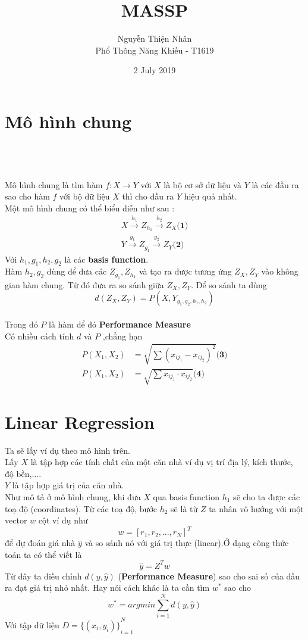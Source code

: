 \documentclass[12pt]{article}
\title{
    MASSP}
\author{
    Nguyễn Thiện Nhân \\
    \large Phổ Thông Năng Khiếu - T1619}
\date{2 July 2019}
\newcommand{\<}{\langle}
\renewcommand{\>}{\rangle}
\theoremstyle{definition}
\begin{document}
\maketitle
\section{Mô hình chung}
\\
\\
\\
Mô hình chung là tìm hàm $f: X \rightarrow Y$ với $X$ là bộ cơ sở dữ liệu và $Y$ là các đầu ra sao cho hàm $f$ với bộ dữ liệu $X$ thì cho đầu ra $Y$ hiệu quả nhất.\\
Một mô hình chung có thể biểu diễn như sau :
\begin{align*}
X \overset{h_1}{\rightarrow}  Z_{h_{1}} \overset{h_2}{\rightarrow} Z_X \textbf{(1)} \\  
Y \overset{g_1}{\rightarrow}  Z_{g_{1}} \overset{g_2}{\rightarrow} Z_Y \textbf{(2)}
\end{align*}
Với $h_1,g_1,h_2,g_2$ là các \textbf{basis function}.\\
Hàm $h_2,g_2$ dùng để đưa các $Z_{g_{1}},Z_{h_{1}}$ và tạo ra được tương ứng $Z_X,Z_Y$ vào không gian hàm chung. Từ đó đưa ra so sánh giữa $Z_X,Z_Y$.
Để so sánh ta dùng $$d(Z_X,Z_Y)=P(X,Y _{g_{1},g_{2},h_{1},h_{2}})$$\\
Trong đó $P$ là hàm để đó \textbf{Performance Measure}\\
Có nhiều cách tính $d$ và $P$ ,chẳng hạn
\begin{align*}
    P(X_1,X_2)&=\sqrt {\sum (x_{ij_1}-x_{ij_2})^2 } \textbf{(3)}\\
    P(X_1,X_2)&=\sqrt {\sum x_{ij_1} \cdot x_{ij_2}} \textbf{(4)}
\end{align*}
\newpage 
\section{Linear Regression}
Ta sẽ lấy ví dụ theo mô hình trên. \\
Lấy $X$ là tập hợp các tính chất của một căn nhà ví dụ vị trí địa lý, kích thước, độ bền,....\\
$Y$ là tập hợp giá trị của căn nhà.\\
Như mô tả ở mô hình chung, khi đưa $X$ qua basis function $h_1$ sẽ cho ta được các toạ độ (coordinates). Từ các toạ độ, bước $h_2$ sẽ là từ $Z$ ta nhân vô hướng với một vector $w$ cột ví dụ như $$w=[r_1,r_2,...,r_N]^T$$ để dự đoán giá nhà $\widehat{y}$  và so sánh nó với giá trị thực (linear).Ở dạng công thức toán ta có thể viết là
$$\widehat{y}=Z^{T}w $$
Từ đây ta điều chỉnh $d(y,\widehat{y})$
(\textbf{Performance Measure}) sao cho sai số của đầu ra đạt giá trị nhỏ nhất. Hay nói cách khác là ta cần tìm $w^*$ sao cho
$$w^*=argmin \sum_{i=1}^{N}d(y,\widehat{y})$$
Với tập dữ liệu $D={\{(x_i,y_i)\}}_{i=1}^{N}$
\end{document}
